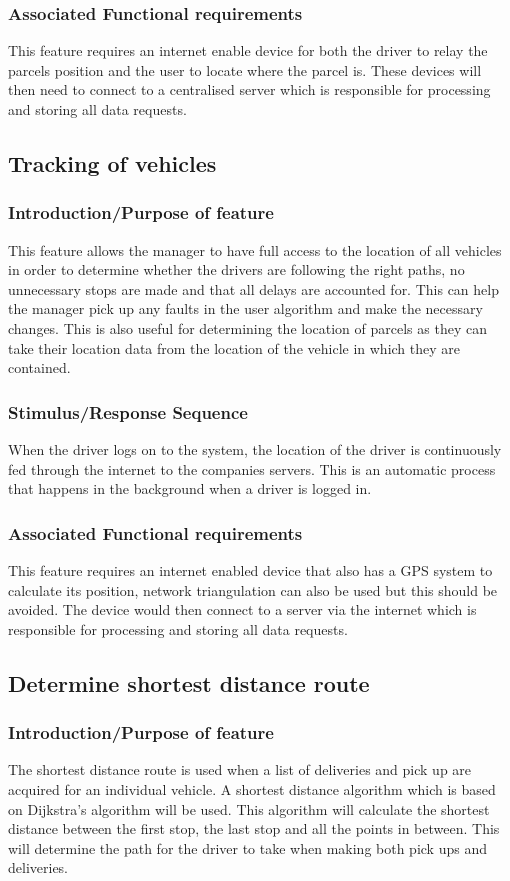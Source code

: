 \documentclass[paper=a4, fontsize=11pt]{scrartcl} %
\numberwithin{equation}{section} %
\numberwithin{figure}{section} %
\numberwithin{table}{section} %
\begin{document}
\subsubsection{Associated Functional requirements}
This feature requires an internet enable device for both the driver to relay the parcels position and the user to locate where the parcel is. These devices will then need to connect to a centralised server which is responsible for processing and storing all data requests. 
\subsection{Tracking of vehicles}
\subsubsection{Introduction/Purpose of feature}
This feature allows the manager to have full access to the location of all vehicles in order to determine whether the drivers are following the right paths, no unnecessary stops are made and that all delays are accounted for. This can help the manager pick up any faults in the user algorithm and make the necessary changes. This is also useful for determining the location of parcels as they can take their location data from the location of the vehicle in which they are contained.
\subsubsection{Stimulus/Response Sequence}
When the driver logs on to the system, the location of the driver is continuously fed through the internet to the companies servers. This is an automatic process that happens in the background when a driver is logged in. 
\subsubsection{Associated Functional requirements}
This feature requires an internet enabled device that also has a GPS system to calculate its position, network triangulation can also be used but this should be avoided. The device would then connect to a server via the internet which is responsible for processing and storing all data requests.
\subsection{Determine shortest distance route}
\subsubsection{Introduction/Purpose of feature}
The shortest distance route is used when a list of deliveries and pick up are acquired for  an individual vehicle. A shortest distance algorithm which is based on Dijkstra's algorithm will be used. This algorithm will calculate the shortest distance between the first stop, the last stop and all the points in between. This will determine the path for the driver to take when making both pick ups and deliveries.
\end{document}
